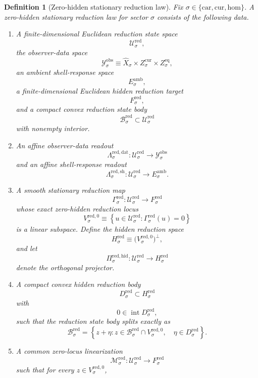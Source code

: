 \documentclass[11pt]{article}
\newcommand{\Car}{\mathrm{car}}
\newcommand{\Cur}{\mathrm{cur}}
\newcommand{\Hom}{\mathrm{hom}}
\newcommand{\VisibleAffine}[1]{\widehat X_{#1}}
\newcommand{\DataSpace}[1]{\mathcal Y_{#1}^{\mathrm{obs}}}
\newcommand{\AmbientTarget}[1]{E_{#1}^{\mathrm{amb}}}
\newcommand{\RedSpace}[1]{\mathcal U_{#1}^{\mathrm{red}}}
\newcommand{\RedBody}[1]{\mathcal B_{#1}^{\mathrm{red}}}
\newcommand{\RedData}[1]{\Lambda_{#1}^{\mathrm{red,dat}}}
\newcommand{\RedShell}[1]{\Lambda_{#1}^{\mathrm{red,sh}}}
\newcommand{\RedTarget}[1]{F_{#1}^{\mathrm{red}}}
\newcommand{\RedMap}[1]{\Gamma_{#1}^{\mathrm{red}}}
\newcommand{\RedZero}[1]{V_{#1}^{\mathrm{red},0}}
\newcommand{\RedHidden}[1]{H_{#1}^{\mathrm{red}}}
\newcommand{\RedHiddenBody}[1]{D_{#1}^{\mathrm{red}}}
\newcommand{\RedProj}[1]{\Pi_{#1}^{\mathrm{red,hid}}}
\newcommand{\RedLin}[1]{\mathcal M_{#1}^{\mathrm{red}}}
\newtheorem{definition}{Definition}
\begin{document}
\begin{definition}[Zero-hidden stationary reduction law]
\label{def:reduction}
Fix \(\sigma\in\{\Car,\Cur,\Hom\}\). A \emph{zero-hidden stationary reduction law} for sector \(\sigma\) consists of the following data.
\begin{enumerate}
    \item A finite-dimensional Euclidean reduction state space
    \[
    \RedSpace{\sigma},
    \]
    the observer-data space
    \[
    \DataSpace{\sigma}
    \equiv
    \VisibleAffine{\sigma}\times Z_{\sigma}^{\mathrm{cur}}\times Z_{\sigma}^{\mathrm{eq}},
    \]
    an ambient shell-response space
    \[
    \AmbientTarget{\sigma},
    \]
    a finite-dimensional Euclidean hidden reduction target
    \[
    \RedTarget{\sigma},
    \]
    and a compact convex reduction state body
    \[
    \RedBody{\sigma}\subset\RedSpace{\sigma}
    \]
    with nonempty interior.
    \item An affine observer-data readout
    \[
    \RedData{\sigma}:\RedSpace{\sigma}\to\DataSpace{\sigma}
    \]
    and an affine shell-response readout
    \[
    \RedShell{\sigma}:\RedSpace{\sigma}\to\AmbientTarget{\sigma}.
    \]
    \item A smooth stationary reduction map
    \[
    \RedMap{\sigma}:\RedSpace{\sigma}\to\RedTarget{\sigma}
    \]
    whose exact zero-hidden reduction locus
    \[
    \RedZero{\sigma}
    \equiv
    \left\{
    u\in\RedSpace{\sigma}:
    \RedMap{\sigma}(u)=0
    \right\}
    \]
    is a linear subspace. Define the hidden reduction space
    \[
    \RedHidden{\sigma}
    \equiv
    \bigl(\RedZero{\sigma}\bigr)^{\perp},
    \]
    and let
    \[
    \RedProj{\sigma}:\RedSpace{\sigma}\to\RedHidden{\sigma}
    \]
    denote the orthogonal projector.
    \item A compact convex hidden reduction body
    \[
    \RedHiddenBody{\sigma}\subset\RedHidden{\sigma}
    \]
    with
    \[
    0\in\operatorname{int}\RedHiddenBody{\sigma},
    \]
    such that the reduction state body splits exactly as
    \begin{equation}
    \RedBody{\sigma}
    =
    \left\{
    z+\eta:
    z\in\RedBody{\sigma}\cap\RedZero{\sigma},
    \quad
    \eta\in\RedHiddenBody{\sigma}
    \right\}.
    \label{eq:redsplitting}
    \end{equation}
    \item A common zero-locus linearization
    \[
    \RedLin{\sigma}:\RedSpace{\sigma}\to\RedTarget{\sigma}
    \]
    such that for every \(z\in\RedZero{\sigma}\),
    \begin{equation}

\end{equation}
\end{enumerate}
\end{definition}
\end{document}
